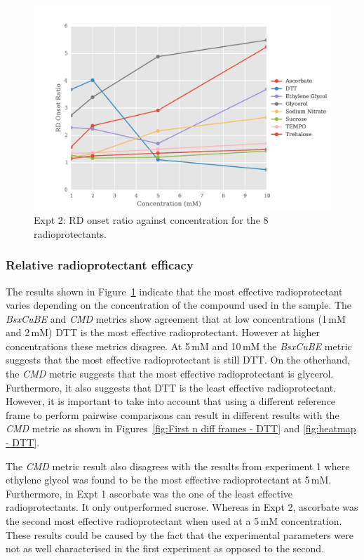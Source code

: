 \begin{figure}
    \centering
    \includegraphics[width=1.0\textwidth]{figures/saxs/RatioPlots.pdf}
    \caption{Expt 2: RD onset ratio against concentration for the 8 radioprotectants.}
    \label{fig:SAXS Ratio plot}
\end{figure}

\subsubsection{Relative radioprotectant efficacy}
\label{subs:Relative radioprotectant efficacy}
The results shown in Figure~\ref{fig:SAXS Ratio plot} indicate that the most effective radioprotectant varies depending on the concentration of the compound used in the sample.
The \textit{BsxCuBE} and \textit{CMD} metrics show agreement that at low concentrations (1$\,$mM and 2$\,$mM) DTT is the most effective radioprotectant.
However at higher concentrations these metrics disagree.
At 5$\,$mM and 10$\,$mM the \textit{BsxCuBE} metric suggests that the most effective radioprotectant is still DTT.
On the otherhand, the \textit{CMD} metric suggests that the most effective radioprotectant is glycerol.
Furthermore, it also suggests that DTT is the least effective radioprotectant.
However, it is important to take into account that using a different reference frame to perform pairwise comparisons can result in different results with the \textit{CMD} metric as shown in Figures~\ref{fig:First n diff frames - DTT} and \ref{fig:heatmap - DTT}.

The \textit{CMD} metric result also disagrees with the results from experiment 1 where ethylene glycol was found to be the most effective radioprotectant at 5$\,$mM.
Furthermore, in Expt 1 ascorbate was the one of the least effective radioprotectants.
It only outperformed sucrose.
Whereas in Expt 2, ascorbate was the second most effective radioprotectant when used at a 5$\,$mM concentration.
These results could be caused by the fact that the experimental parameters were not as well characterised in the first experiment as opposed to the second.
